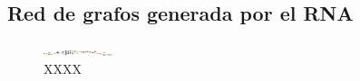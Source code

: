 \subsection{Red de grafos generada por el RNA}

 \lipsum[1]

\begin{figure}[H]
	\centering
	\includegraphics[angle = 90, width=0.18\textwidth]{Figuras/Graph_3}
	\centering\caption{XXXX}
\end{figure}

\lipsum[1]